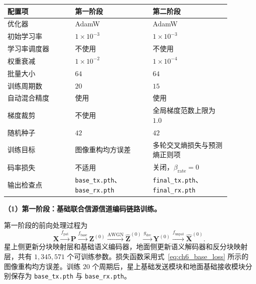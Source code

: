 \begin{table}[!htp]
    \centering
    \label{tab:app_ch6_training_hyperparameters}
    \small
    \setlength{\tabcolsep}{4.2pt}
    \renewcommand{\arraystretch}{1.15}
    \begin{tabular}{@{}p{0.27\linewidth}p{0.31\linewidth}p{0.31\linewidth}@{}}
        \toprule
        配置项 & 第一阶段 & 第二阶段 \\
        \midrule
        优化器 & AdamW & AdamW \\
        初始学习率 & $1\times10^{-3}$ & $1\times10^{-3}$ \\
        学习率调度器 & 不使用 & 不使用 \\
        权重衰减 & $1\times10^{-2}$ & $1\times10^{-4}$ \\
        批量大小 & $64$ & $64$ \\
        训练周期数 & $20$ & $15$ \\
        自动混合精度 & 使用 & 使用 \\
        梯度裁剪 & 不使用 & 全局梯度范数上限为 $1.0$ \\
        随机种子 & $42$ & $42$ \\
        训练目标 & 图像重构均方误差 & 多轮交叉熵损失与预测熵正则项 \\
        码率损失 & 不适用 & 关闭，$\beta_{\mathrm{rate}}=0$ \\
        输出检查点 & \texttt{base\_tx.pth}、\texttt{base\_rx.pth} & \texttt{final\_tx.pth}、\texttt{final\_rx.pth} \\
        \bottomrule
    \end{tabular}
\end{table}

\noindent\textbf{（1）第一阶段：基础联合信源信道编码链路训练。}

第一阶段的前向处理过程为
\begin{equation}
\mathbf X
\xrightarrow{f_{\mathrm{pat}}}
\mathbf P
\xrightarrow{f_{\mathrm{base}}}
\mathbf Z^{(0)}
\xrightarrow{\mathrm{AWGN}}
\hat{\mathbf Z}^{(0)}
\xrightarrow{g_{\mathrm{dec}}}
\mathbf Y^{(0)}
\xrightarrow{f_{\mathrm{unpat}}}
\hat{\mathbf X}^{(0)}.
\label{eq:app_ch6_stage1_flow}
\end{equation}
星上侧更新分块映射层和基础语义编码器，地面侧更新语义解码器和反分块映射层，共有 $1{,}345{,}571$ 个可训练参数。损失函数采用式~\eqref{eq:ch6_base_loss} 所示的图像重构均方误差。训练 $20$ 个周期后，星上基础发送模块和地面基础接收模块分别保存为 \texttt{base\_tx.pth} 与 \texttt{base\_rx.pth}。

